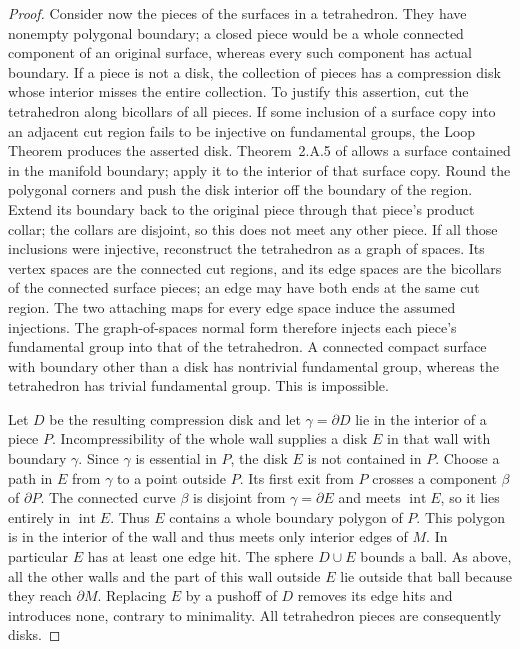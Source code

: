 \documentclass[11pt]{article}
\numberwithin{equation}{section}
\theoremstyle{definition}
\theoremstyle{remark}
\DeclareMathOperator{\interior}{int}
\begin{document}
\begin{proof}
Consider now the pieces of the surfaces in a tetrahedron.  They have nonempty
polygonal boundary; a closed piece would be a whole connected component of
an original surface, whereas every such component has actual boundary.
If a piece is not a disk, the collection of pieces has a compression disk
whose interior misses the entire collection.  To justify this assertion, cut
the tetrahedron along bicollars of all pieces.  If some inclusion of a surface
copy into an adjacent cut region fails to be injective on fundamental groups,
the Loop Theorem produces the asserted disk.  Theorem~2.A.5 of \cite[p.~13]{Stallings1971} allows a surface
contained in the manifold boundary; apply it to the interior of that
surface copy.  Round the polygonal corners and push the
disk interior off the boundary of the region.  Extend its boundary back
to the original piece through that piece's product collar; the collars
are disjoint, so this does not meet any other piece.
If all those inclusions were
injective, reconstruct the tetrahedron as a graph of spaces.  Its vertex
spaces are the connected cut regions, and its edge spaces are the
bicollars of the connected surface pieces; an edge may have both ends
at the same cut region.  The two attaching maps for every edge space
induce the assumed injections.  The graph-of-spaces normal form
therefore injects each piece's fundamental group into that of the
tetrahedron.  A connected compact surface
with boundary other than a disk has nontrivial fundamental group, whereas the
tetrahedron has trivial fundamental group.  This is impossible.

Let $D$ be the resulting compression disk and let $\gamma=\partial D$ lie in
the interior of a piece $P$.  Incompressibility of the whole wall supplies a
disk $E$ in that wall with boundary $\gamma$.  Since $\gamma$ is essential in
$P$, the disk $E$ is not contained in $P$.  Choose a path in $E$ from
$\gamma$ to a point outside $P$.  Its first exit from $P$ crosses a
component $\beta$ of $\partial P$.  The connected curve $\beta$ is
disjoint from $\gamma=\partial E$ and meets $\interior E$, so it lies
entirely in $\interior E$.  Thus $E$ contains a whole boundary polygon
of $P$.
This polygon is in the interior of the wall and thus meets only interior
edges of $M$.  In particular $E$ has at least one edge hit.  The sphere
$D\cup E$ bounds a ball.  As above, all the other walls and the part of this
wall outside $E$ lie outside that ball because they reach $\partial M$.
Replacing $E$ by a pushoff of $D$ removes its edge hits and introduces none,
contrary to minimality.  All tetrahedron pieces are consequently disks.


\end{proof}
\end{document}
